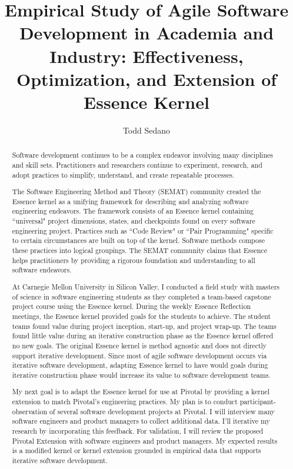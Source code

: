 \documentclass[preprint,12pt,3p]{elsarticle}
\begin{document}
\begin{frontmatter}

\title{Empirical Study of Agile Software Development in Academia and Industry: Effectiveness, Optimization, and Extension of Essence Kernel}

\author{Todd Sedano}


\address{Carnegie Mellon University}
\address{Silicon Valley Campus}
\address{Moffett Field, CA 94035, USA}


\begin{abstract}
Software development continues to be a complex endeavor involving many disciplines and skill sets. Practitioners and researchers continue to experiment, research, and adopt practices to simplify, understand, and create repeatable processes. 

The Software Engineering Method and Theory (SEMAT) community created the Essence kernel as a unifying framework for describing and analyzing software engineering endeavors. The framework consists of an Essence kernel containing ``universal" project dimensions, states, and checkpoints found on every software engineering project. Practices such as ``Code Review" or ``Pair Programming" specific to certain circumstances are built on top of the kernel. Software methods compose these practices into logical groupings. The SEMAT community claims that Essence helps practitioners by providing a rigorous foundation and understanding to all software endeavors. 

At Carnegie Mellon University in Silicon Valley, I conducted a field study with masters of science in software engineering students as they completed a team-based capstone project course using the Essence kernel. During the weekly Essence Reflection meetings, the Essence kernel provided goals for the students to achieve. The student teams found value during project inception, start-up, and project wrap-up. The teams found little value during an iterative construction phase as the Essence kernel offered no new goals. The original Essence kernel is method agnostic and does not directly support iterative development. Since most of agile software development occurs via iterative software development, adapting Essence kernel to have would goals during iterative construction phase would increase its value to software development teams.

My next goal is to adapt the Essence kernel for use at Pivotal by providing a kernel extension to match Pivotal's engineering practices. My plan is to conduct participant-observation of several software development projects at Pivotal. I will interview many software engineers and product managers to collect additional data. I'll iterative my research by incorporating this feedback. For validation, I will review the proposed Pivotal Extension with software engineers and product managers. My expected results is a modified kernel or kernel extension grounded in empirical data that supports iterative software development. 


\end{abstract}
\end{frontmatter}
\end{document}
